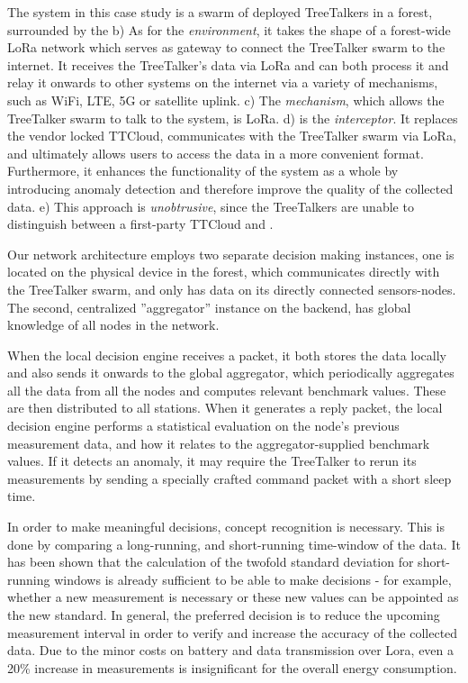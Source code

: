 The system in this case study is a swarm of deployed TreeTalkers in a forest,
surrounded by the 
b) As for the \textit{environment}, it takes the shape of a forest-wide LoRa network which serves as gateway to connect the TreeTalker swarm to the internet.
It receives the TreeTalker's data via LoRa and can both process it and relay it onwards to other systems on the internet via a variety of mechanisms, such as WiFi, LTE, 5G or satellite uplink.
c) The \textit{mechanism}, which allows the TreeTalker swarm to talk to the system, is LoRa.
d) \textit{\ttt} is the \textit{interceptor}.
It replaces the vendor locked TTCloud, communicates with the TreeTalker swarm via LoRa, and ultimately allows users to access the data in a more convenient format.
Furthermore, it enhances the functionality of the system as a whole by introducing anomaly detection and therefore improve the quality of the collected data.
e) This approach is \textit{unobtrusive}, since the TreeTalkers are unable to distinguish between a first-party TTCloud and \ttt.

Our network architecture employs two separate decision making instances, one is located on the physical device in the forest, which communicates directly with the TreeTalker swarm, and only has data on its directly connected sensors-nodes.
The second, centralized ''aggregator'' instance on the backend, has global knowledge of all nodes in the network.

When the local decision engine receives a packet, it both stores the data locally and also sends it onwards to the global aggregator, which periodically aggregates all the data from all the nodes and computes relevant benchmark values. 
These are then distributed to all stations.
When it generates a reply packet, the local decision engine performs a statistical evaluation on the node's previous measurement data, and how it relates to the aggregator-supplied benchmark values.
If it detects an anomaly, it may require the TreeTalker to rerun its measurements by sending a specially crafted command packet with a short sleep time.

In order to make meaningful decisions, concept recognition is necessary.
This is done by comparing a long-running, and short-running time-window of the data.
It has been shown that the calculation of the twofold standard deviation for short-running windows is already sufficient to be able to make decisions - for example, whether a new measurement is necessary or these new values can be appointed as the new standard.
In general, the preferred decision is to reduce the upcoming measurement interval in order to verify and increase the accuracy of the collected data.
Due to the minor costs on battery and data transmission over Lora, even a 20\% increase in measurements is insignificant for the overall energy consumption. 

